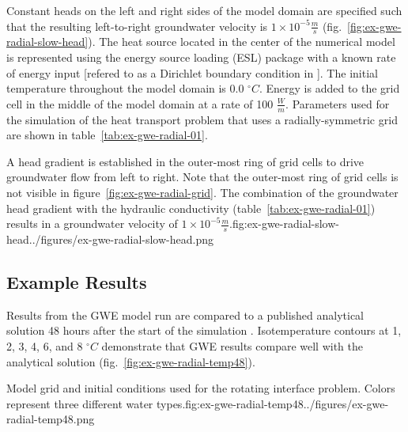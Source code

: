 Constant heads on the left and right sides of the model domain are specified such that the resulting left-to-right groundwater velocity is $1 \times 10^{-5} \tfrac{m}{s}$ (fig.~\ref{fig:ex-gwe-radial-slow-head}).  The heat source located in the center of the numerical model is represented using the energy source loading (ESL) package with a known rate of energy input [refered to as a Dirichlet boundary condition in \cite{alKhoury2020}].  The initial temperature throughout the model domain is 0.0 $^{\circ}C$. Energy is added to the grid cell in the middle of the model domain at a rate of 100 $\tfrac{W}{m}$.  Parameters used for the \mf simulation of the heat transport problem that uses a radially-symmetric grid are shown in table~\ref{tab:ex-gwe-radial-01}.



\begin{StandardFigure}{
    A head gradient is established in the outer-most ring of grid cells to drive groundwater flow from left to right. Note that the outer-most ring of grid cells is not visible in figure~\ref{fig:ex-gwe-radial-grid}.  The combination of the groundwater head gradient with the hydraulic conductivity (table~\ref{tab:ex-gwe-radial-01}) results in a groundwater velocity of $1 \times 10^{-5} \tfrac{m}{s}$.}{fig:ex-gwe-radial-slow-head}{../figures/ex-gwe-radial-slow-head.png}
\end{StandardFigure}

\subsection{Example Results}

Results from the GWE model run are compared to a published analytical solution 48 hours after the start of the simulation \citep{alKhoury2020}.  Isotemperature contours at 1, 2, 3, 4, 6, and 8 $^{\circ}C$ demonstrate that GWE results compare well with the analytical solution (fig.~\ref{fig:ex-gwe-radial-temp48}).

\begin{StandardFigure}{
    Model grid and initial conditions used for the rotating interface problem.  Colors represent three different water types.}{fig:ex-gwe-radial-temp48}{../figures/ex-gwe-radial-temp48.png}
\end{StandardFigure}

